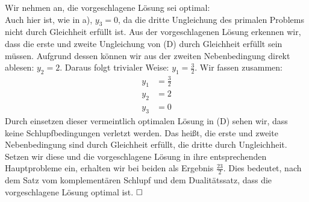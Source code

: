 \documentclass [a4paper,11pt]{article}
\begin{document}
\begin{enumerate}
\begin{enumerate}
                    Wir nehmen an, die vorgeschlagene Lösung sei optimal: \\
                    Auch hier ist, wie in a), $y_3 = 0$, da die dritte Ungleichung des primalen Problems nicht durch Gleichheit erfüllt ist. Aus der
                    vorgeschlagenen Lösung erkennen wir, dass die erste und zweite Ungleichung von (D) durch Gleichheit erfüllt sein müssen.
                    Aufgrund dessen können wir aus der zweiten Nebenbedingung direkt ablesen: $y_2 = 2$. Daraus folgt trivialer Weise: $y_1 = \frac{3}{2}$.
                    Wir fassen zusammen:
                    \begin{align*}
                    y_1 &= \frac{3}{2}\\
                    y_2 &= 2\\
                    y_3 &= 0
                    \end{align*}
                    Durch einsetzen dieser vermeintlich optimalen Lösung in (D) sehen wir, dass keine Schlupfbedingungen verletzt werden. Das heißt, die
                    erste und zweite Nebenbedingung sind durch Gleichheit erfüllt, die dritte durch Ungleichheit. Setzen wir diese und die vorgeschlagene
                    Lösung in ihre entsprechenden Hauptprobleme ein, erhalten wir bei beiden als Ergebnis $\frac{23}{2}$. Dies bedeutet, nach dem Satz vom
                    komplementären Schlupf und dem Dualitätssatz, dass die vorgeschlagene Lösung optimal ist. $\qed$

            \end{enumerate}


\end{enumerate}
\end{document}
